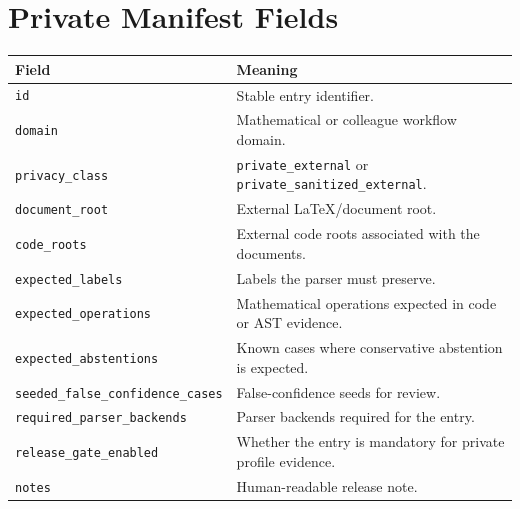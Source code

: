 \documentclass[12pt,a4paper,openany]{book}
\begin{document}
\chapter{Private Manifest Fields}

\begin{longtable}{p{}p{}}
\toprule
Field & Meaning \\
\midrule
\texttt{id} & Stable entry identifier. \\
\texttt{domain} & Mathematical or colleague workflow domain. \\
\texttt{privacy\_class} & \texttt{private\_external} or \texttt{private\_sanitized\_external}. \\
\texttt{document\_root} & External LaTeX/document root. \\
\texttt{code\_roots} & External code roots associated with the documents. \\
\texttt{expected\_labels} & Labels the parser must preserve. \\
\texttt{expected\_operations} & Mathematical operations expected in code or AST evidence. \\
\texttt{expected\_abstentions} & Known cases where conservative abstention is expected. \\
\texttt{seeded\_false\_confidence\_cases} & False-confidence seeds for review. \\
\texttt{required\_parser\_backends} & Parser backends required for the entry. \\
\texttt{release\_gate\_enabled} & Whether the entry is mandatory for private profile evidence. \\
\texttt{notes} & Human-readable release note. \\
\bottomrule
\end{longtable}

\backmatter


\end{document}
